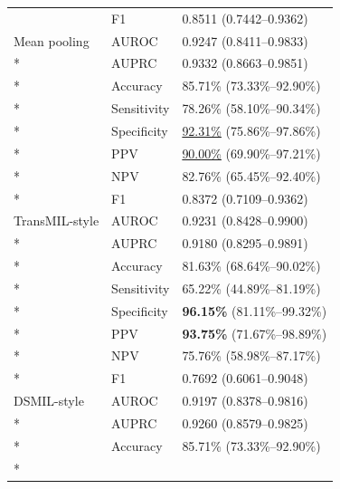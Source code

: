 \begin{longtable}{@{}p{}p{}p{}@{}}
 & F1 & 0.8511 (0.7442--0.9362) \\

\addlinespace

Mean pooling & AUROC & 0.9247 (0.8411--0.9833) \\*

 & AUPRC & 0.9332 (0.8663--0.9851) \\*

 & Accuracy & 85.71\% (73.33\%--92.90\%) \\*

 & Sensitivity & 78.26\% (58.10\%--90.34\%) \\*

 & Specificity & \underline{92.31\%} (75.86\%--97.86\%) \\*

 & PPV & \underline{90.00\%} (69.90\%--97.21\%) \\*

 & NPV & 82.76\% (65.45\%--92.40\%) \\*

 & F1 & 0.8372 (0.7109--0.9362) \\

\addlinespace

TransMIL-style & AUROC & 0.9231 (0.8428--0.9900) \\*

 & AUPRC & 0.9180 (0.8295--0.9891) \\*

 & Accuracy & 81.63\% (68.64\%--90.02\%) \\*

 & Sensitivity & 65.22\% (44.89\%--81.19\%) \\*

 & Specificity & \textbf{96.15\%} (81.11\%--99.32\%) \\*

 & PPV & \textbf{93.75\%} (71.67\%--98.89\%) \\*

 & NPV & 75.76\% (58.98\%--87.17\%) \\*

 & F1 & 0.7692 (0.6061--0.9048) \\

\addlinespace

DSMIL-style & AUROC & 0.9197 (0.8378--0.9816) \\*

 & AUPRC & 0.9260 (0.8579--0.9825) \\*

 & Accuracy & 85.71\% (73.33\%--92.90\%) \\*


\end{longtable}
